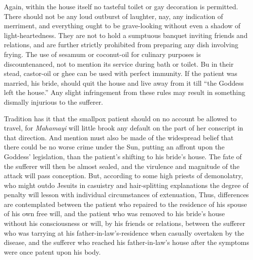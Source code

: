 \documentclass[a4paper, 12pt, oneside, english]{article}
\begin{document}
Again, within the house itself no tasteful toilet or gay decoration is permitted. There should not be any loud outburst of laughter, nay, any indication of merriment, and everything ought to be grave-looking without even a shadow of light-heartedness. They are not to hold a sumptuous banquet inviting friends and relations, and are further strictly prohibited from preparing any dish involving frying. The use of sesamum or coconut-oil for culinary purposes is discountenanced, not to mention its service during bath or toilet. Bu in their stead, castor-oil or ghee can be used with perfect immunity. If the patient was married, his bride, should quit the house and live away from it till ``the Goddess left the house.'' Any slight infringement from these rules may result in something dismally injurious to the sufferer.

Tradition has it that the smallpox patient should on no account be allowed to travel, for \emph{Mahamayi} will little brook any default on the part of her conscript in that direction. And mention must also be made of the widespread belief that there could be no worse crime under the Sun, putting an affront upon the Goddess' legislation, than the patient's shifting to his bride's house. The fate of the sufferer will then be almost sealed, and the virulence and magnitude of the attack will pass conception. But, according to some high priests of demonolatry, who might outdo Jesuits in casuistry and hair-splitting explanations the degree of penalty will lesson with individual circumstances of extenuation, Thus, differences are contemplated between the patient who repaired to the residence of his spouse of his own free will, and the patient who was removed to his bride's house without his consciousness or will, by his friends or relations, between the sufferer who was tarrying at his father-in-law's-residence when casually overtaken by the disease, and the sufferer who reached his father-in-law's house after the symptoms were once patent upon his body.
\end{document}
